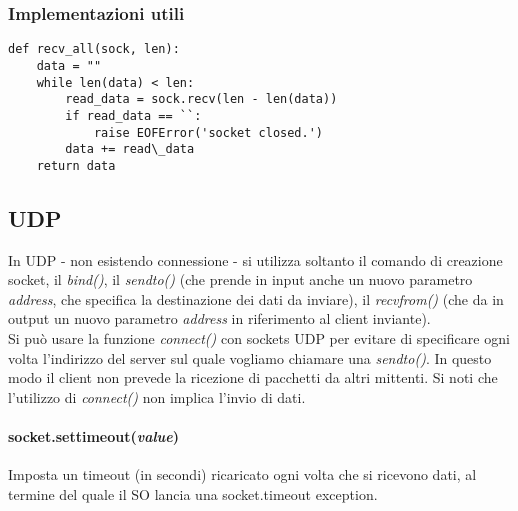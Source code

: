 \subsubsection{Implementazioni utili}
\begin{lstlisting}
def recv_all(sock, len):
    data = ""
    while len(data) < len:
        read_data = sock.recv(len - len(data))
        if read_data == ``:
            raise EOFError('socket closed.')
        data += read\_data
    return data
\end{lstlisting}

\subsection{UDP}
In UDP - non esistendo connessione - si utilizza soltanto il comando di creazione socket, il \textit{bind()}, il \textit{sendto()} (che prende in input anche un nuovo parametro \textit{address}, che specifica la destinazione dei dati da inviare), il \textit{recvfrom()} (che da in output un nuovo parametro \textit{address} in riferimento al client inviante). \\
Si può usare la funzione \textit{connect()} con sockets UDP per evitare di specificare ogni volta l'indirizzo del server sul quale vogliamo chiamare una \textit{sendto()}. In questo modo il client non prevede la ricezione di pacchetti da altri mittenti. Si noti che l'utilizzo di \textit{connect()} non implica l'invio di dati. 

\paragraph{socket.settimeout(\textit{value})}
Imposta un timeout (in secondi) ricaricato ogni volta che si ricevono dati, al termine del quale il SO lancia una socket.timeout exception.